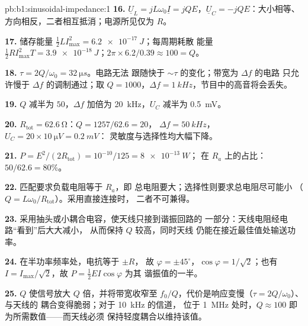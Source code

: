 \begin{solution}{pb:b1:sinusoidal-impedance:1}
\textbf{16.} $\underline U_L = jL\omega_0\underline I = jQE$，$\underline U_C
= -jQE$：大小相等、方向相反，二者相互抵消；电源所见仅为 $R$。

\textbf{17.} 储存能量 $\tfrac12 LI_{\max}^2 = \qty{6.2e-17}{J}$；每周期耗散
能量 $\tfrac12 RI_{\max}^2T = \qty{3.9e-18}{J}$；$2\pi \times 6.2/0.39
\approx 100 = Q$。

\textbf{18.} $\tau = 2Q/\omega_0 = \qty{32}{\micro s}$。电路无法
跟随快于 $\sim\tau$ 的变化；带宽为 $\Delta f$ 的电路
只允许慢于 $\Delta f$ 的调制通过；取 $Q = 1000$，$\Delta f =
\qty{1}{kHz}$，节目中的高音将会丢失。

\textbf{19.} $Q$ 减半为 $50$，$\Delta f$ 加倍为 \qty{20}{kHz}，$U_C$
减半为 \qty{0.5}{mV}。

\textbf{20.} $R_{\text{tot}} = \qty{62.6}{\ohm}$：$Q = 1257/62.6 = 20$，
$\Delta f = \qty{50}{kHz}$，$U_C = 20 \times \qty{10}{\micro V} = \qty{0.2}{mV}$：
灵敏度与选择性均大幅下降。

\textbf{21.} $P = E^2/(2R_{\text{tot}}) = 10^{-10}/125 = \qty{8e-13}{W}$；
在 $R_a$ 上的占比：$50/62.6 = 80\%$。

\textbf{22.} 匹配要求负载电阻等于 $R_a$，即
总电阻要大；选择性则要求总电阻尽可能小
（$Q = L\omega_0/R_{\text{tot}}$）。采用直接连接时，
二者不可兼得。

\textbf{23.} 采用抽头或小耦合电容，使天线只接到谐振回路的
一部分：天线电阻经电路“看到”后大大减小，
从而保持 $Q$ 较高，同时天线
仍能在接近最佳值处输送功率。

\textbf{24.} 在半功率频率处，电抗等于 $\pm R$，
故 $\varphi = \pm45^\circ$，$\cos\varphi = 1/\sqrt2$；也有 $I =
I_{\max}/\sqrt2$，故 $P = \tfrac12 EI\cos\varphi$ 为其
谐振值的一半。

\textbf{25.} $Q$ 使信号放大 $Q$ 倍，并将带宽收窄至
$f_0/Q$，代价是响应变慢（$\tau = 2Q/\omega_0$）、与天线的
耦合变得脆弱；对于 \qty{10}{kHz} 的信道，
位于 \qty{1}{MHz} 处时，$Q \approx 100$ 即为所需数值——而天线必须
保持轻度耦合以维持该值。
\end{solution}
